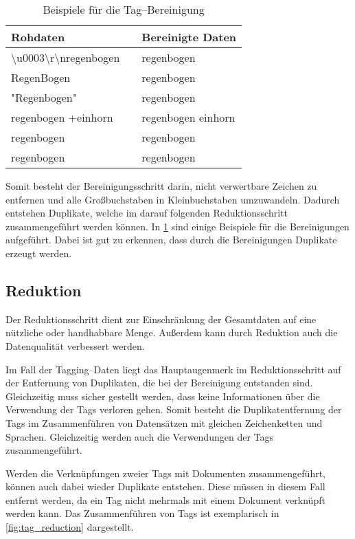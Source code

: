 \begin{table}
\centering
\begin{tabular}{lcl}
    \toprule
    Rohdaten & \phantom{abc} & Bereinigte Daten \\
    \midrule
    \textbackslash u0003\textbackslash r\textbackslash nregenbogen && regenbogen \\
    RegenBogen && regenbogen \\
    "Regenbogen" && regenbogen \\
    regenbogen +einhorn && regenbogen einhorn\\
    \phantom{abc} regenbogen && regenbogen \\
    regenbogen && regenbogen \\
    \bottomrule
\end{tabular}
\caption{Beispiele für die Tag--Bereinigung}
\label{tab:tag_cleaning}
\end{table}

Somit besteht der Bereinigungsschritt darin, nicht verwertbare Zeichen zu entfernen und alle Großbuchstaben in Kleinbuchstaben umzuwandeln. Dadurch entstehen Duplikate, welche im darauf folgenden Reduktionsschritt zusammengeführt werden können. In \cref{tab:tag_cleaning} sind einige Beispiele für die Bereinigungen aufgeführt. Dabei ist gut zu erkennen, dass durch die Bereinigungen Duplikate erzeugt werden.

\subsection{Reduktion}

Der Reduktionsschritt dient zur Einschränkung der Gesamtdaten auf eine nützliche oder handhabbare Menge. Außerdem kann durch Reduktion auch die Datenqualität verbessert werden.

Im Fall der Tagging--Daten liegt das Hauptaugenmerk im Reduktionsschritt auf der Entfernung von Duplikaten, die bei der Bereinigung entstanden sind. Gleichzeitig muss sicher gestellt werden, dass keine Informationen über die Verwendung der Tags verloren gehen. Somit besteht die Duplikatentfernung der Tags im Zusammenführen von Datensätzen mit gleichen Zeichenketten und Sprachen. Gleichzeitig werden auch die Verwendungen der Tags zusammengeführt.

Werden die Verknüpfungen zweier Tags mit Dokumenten zusammengeführt, können auch dabei wieder Duplikate entstehen. Diese müssen in diesem Fall entfernt werden, da ein Tag nicht mehrmals mit einem Dokument verknüpft werden kann. Das Zusammenführen von Tags ist exemplarisch in \cref{fig:tag_reduction} dargestellt.

